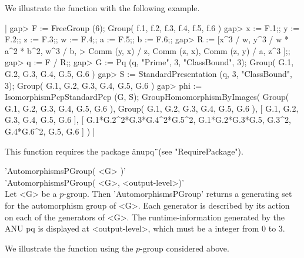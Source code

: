 We illustrate the function with the following example.

|    gap> F := FreeGroup (6);
    Group( f.1, f.2, f.3, f.4, f.5, f.6 )
    gap> x := F.1;; y := F.2;; z := F.3;; w := F.4;; a := F.5;; b := F.6;;
    gap> R := [x^3 / w, y^3 / w * a^2 * b^2, w^3 / b,
    >             Comm (y, x) / z, Comm (z, x), Comm (z, y) / a, z^3 ];;
    gap> q := F / R;;
    gap> G := Pq (q, "Prime", 3, "ClassBound", 3);
    Group( G.1, G.2, G.3, G.4, G.5, G.6 )
    gap> S := StandardPresentation (q, 3, "ClassBound", 3);
    Group( G.1, G.2, G.3, G.4, G.5, G.6 )
    gap> phi := IsomorphismPcpStandardPcp (G, S);
    GroupHomomorphismByImages( Group( G.1, G.2, G.3, G.4, G.5,
    G.6 ), Group( G.1, G.2, G.3, G.4, G.5, G.6 ),
    [ G.1, G.2, G.3, G.4, G.5, G.6 ],
    [ G.1*G.2^2*G.3*G.4^2*G.5^2, G.1*G.2*G.3*G.5, G.3^2, G.4*G.6^2, G.5,
      G.6 ] ) |

This function requires the package \"anupq\"\ (see "RequirePackage").


'AutomorphismsPGroup( <G> )' \\
'AutomorphismsPGroup( <G>, <output-level>)' \\

Let  <G>  be  a  $p$-group.   Then  'AutomorphismsPGroup'   returns  a
generating  set  for  the automorphism  group of <G>.  Each  generator
is    described   by its  action  on  each  of  the generators of <G>.
The runtime-information  generated  by  the ANU pq is displayed at
<output-level>, which must be a integer from 0 to 3.

We illustrate the function using the $p$-group considered above.

